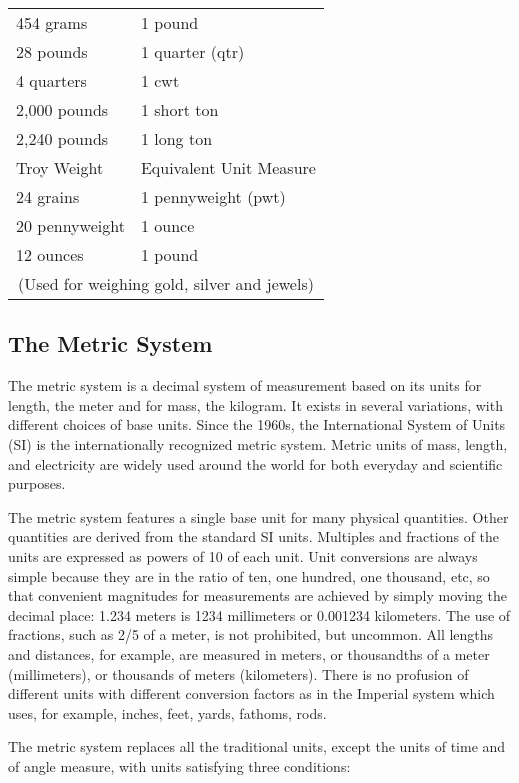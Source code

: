 \begin{table}
\begin{tabular}{ll}
454 grams &1 pound\\
28 pounds &1 quarter (qtr)\\
4 quarters &1 cwt\\
2,000 pounds &1 short ton\\
2,240 pounds &1 long ton\\
\hline
\hline
Troy Weight & Equivalent Unit Measure\\
\hline \hline
24 grains & 1 pennyweight (pwt)\\
20 pennyweight & 1 ounce\\
12 ounces & 1 pound\\
\multicolumn{2}{c}{(Used for weighing gold, silver and jewels)}\\
\hline
\end{tabular}
\label{chap3tab:1}
\end{table}

\subsection*{The Metric System}
The metric system is a decimal system of measurement based on its units for length,
the meter and for mass, the kilogram. It exists in several variations, with different choices of
base units. Since the 1960s, the International System of Units (SI) is the internationally
recognized metric system. Metric units of mass, length, and electricity are widely used
around the world for both everyday and scientific purposes.

The metric system features a single base unit for many physical quantities. Other
quantities are derived from the standard SI units. Multiples and fractions of the units are
expressed as powers of 10 of each unit. Unit conversions are always simple because they
are in the ratio of ten, one hundred, one thousand, etc, so that convenient magnitudes for
measurements are achieved by simply moving the decimal place: 1.234 meters is 1234
millimeters or 0.001234 kilometers. The use of fractions, such as 2/5 of a meter, is not
prohibited, but uncommon. All lengths and distances, for example, are measured in meters,
or thousandths of a meter (millimeters), or thousands of meters (kilometers). There is no
profusion of different units with different conversion factors as in the Imperial system which
uses, for example, inches, feet, yards, fathoms, rods.

The metric system replaces all the traditional units, except the units of time and of
angle measure, with units satisfying three conditions:


